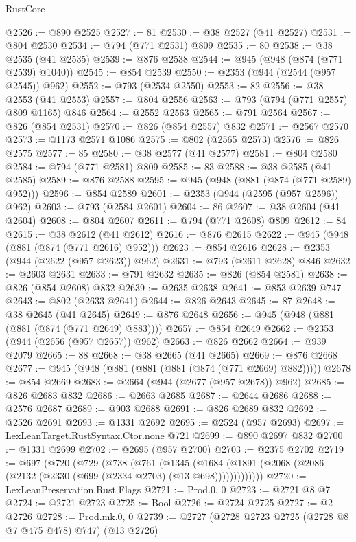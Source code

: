 \begin{lexlean}{RustCore}
\begin{coremodule}
@2526 := @890 @2525
@2527 := 81
@2530 := @38 @2527 (@41 @2527)
@2531 := @804 @2530
@2534 := @794 (@771 @2531) @809
@2535 := 80
@2538 := @38 @2535 (@41 @2535)
@2539 := @876 @2538
@2544 := @945 (@948 (@874 (@771 @2539) @1040))
@2545 := @854 @2539
@2550 := @2353 (@944 (@2544 (@957 @2545)) @962)
@2552 := @793 (@2534 @2550)
@2553 := 82
@2556 := @38 @2553 (@41 @2553)
@2557 := @804 @2556
@2563 := @793 (@794 (@771 @2557) @809 @1165) @846
@2564 := @2552 @2563
@2565 := @791 @2564
@2567 := @826 (@854 @2531)
@2570 := @826 (@854 @2557) @832
@2571 := @2567 @2570
@2573 := @1173 @2571 @1086
@2575 := @802 (@2565 @2573)
@2576 := @826 @2575
@2577 := 85
@2580 := @38 @2577 (@41 @2577)
@2581 := @804 @2580
@2584 := @794 (@771 @2581) @809
@2585 := 83
@2588 := @38 @2585 (@41 @2585)
@2589 := @876 @2588
@2595 := @945 (@948 (@881 (@874 (@771 @2589) @952)))
@2596 := @854 @2589
@2601 := @2353 (@944 (@2595 (@957 @2596)) @962)
@2603 := @793 (@2584 @2601)
@2604 := 86
@2607 := @38 @2604 (@41 @2604)
@2608 := @804 @2607
@2611 := @794 (@771 @2608) @809
@2612 := 84
@2615 := @38 @2612 (@41 @2612)
@2616 := @876 @2615
@2622 := @945 (@948 (@881 (@874 (@771 @2616) @952)))
@2623 := @854 @2616
@2628 := @2353 (@944 (@2622 (@957 @2623)) @962)
@2631 := @793 (@2611 @2628) @846
@2632 := @2603 @2631
@2633 := @791 @2632
@2635 := @826 (@854 @2581)
@2638 := @826 (@854 @2608) @832
@2639 := @2635 @2638
@2641 := @853 @2639 @747
@2643 := @802 (@2633 @2641)
@2644 := @826 @2643
@2645 := 87
@2648 := @38 @2645 (@41 @2645)
@2649 := @876 @2648
@2656 := @945 (@948 (@881 (@881 (@874 (@771 @2649) @883))))
@2657 := @854 @2649
@2662 := @2353 (@944 (@2656 (@957 @2657)) @962)
@2663 := @826 @2662
@2664 := @939 @2079
@2665 := 88
@2668 := @38 @2665 (@41 @2665)
@2669 := @876 @2668
@2677 := @945 (@948 (@881 (@881 (@881 (@874 (@771 @2669) @882)))))
@2678 := @854 @2669
@2683 := @2664 (@944 (@2677 (@957 @2678)) @962)
@2685 := @826 @2683 @832
@2686 := @2663 @2685
@2687 := @2644 @2686
@2688 := @2576 @2687
@2689 := @903 @2688
@2691 := @826 @2689 @832
@2692 := @2526 @2691
@2693 := @1331 @2692
@2695 := @2524 (@957 @2693)
@2697 := LexLeanTarget.RustSyntax.Ctor.none @721
@2699 := @890 @2697 @832
@2700 := @1331 @2699
@2702 := @2695 (@957 @2700)
@2703 := @2375 @2702
@2719 := @697
    (@720
      (@729
        (@738
          (@761
            (@1345
              (@1684 (@1891 (@2068 (@2086 (@2132 (@2330 (@699 (@2334 @2703) (@13 @698)))))))))))))
@2720 := LexLeanPreservation.Rust.Flags
@2721 := Prod.{0, 0}
@2723 := @2721 @8 @7
@2724 := @2721 @2723
@2725 := Bool
@2726 := @2724 @2725
@2727 := @2 @2726
@2728 := Prod.mk.{0, 0}
@2739 := @2727 (@2728 @2723 @2725 (@2728 @8 @7 @475 @478) @747) (@13 @2726)

\end{coremodule}
\end{lexlean}
